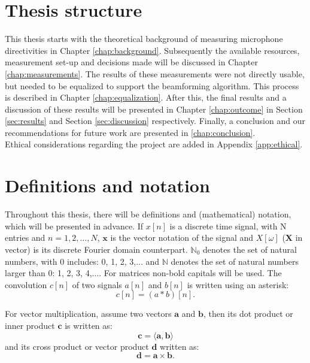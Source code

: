 \section{Thesis structure}
This thesis starts with the theoretical background of measuring microphone directivities in Chapter \ref{chap:background}.
Subsequently the available resources, measurement set-up and decisions made will be discussed in Chapter \ref{chap:measurements}.
The results of these measurements were not directly usable, but needed to be equalized to support the beamforming algorithm.
This process is described in Chapter \ref{chap:equalization}.
After this, the final results and a discussion of these results will be presented in Chapter \ref{chap:outcome} in Section \ref{sec:results} and Section \ref{sec:discussion} respectively.
Finally, a conclusion and our recommendations for future work are presented in \ref{chap:conclusion}. \\
Ethical considerations regarding the project are added in Appendix \ref{app:ethical}.

\section{Definitions and notation}
Throughout this thesis, there will be definitions and (mathematical) notation, which will be presented in advance.
If $x[n]$ is a discrete time signal, with N entries and $n=1,2,\ldots,N$, $\mathbf{x}$ is the vector notation of the signal and $X[\omega]$ ($\mathbf{X}$ in vector) is its discrete Fourier domain counterpart.
$\mathbb{N}_0$ denotes the set of natural numbers, with 0 includes: 0, 1, 2, 3,$\ldots$ and $\mathbb{N}$ denotes the set of natural numbers larger than 0: 1, 2, 3, 4,$\ldots$.
For matrices non-bold capitals will be used.
The convolution $c[n]$ of two signals $a[n]$ and $b[n]$ is written using an asterisk:
\begin{equation*}
c[n]=(a*b)[n].
\end{equation*}

For vector multiplication, assume two vectors $\mathbf{a}$ and $\mathbf{b}$, then its dot product or inner product $\mathbf{c}$ is written as:
\begin{equation*}
\mathbf{c}=\langle \mathbf{a},\mathbf{b}\rangle
\end{equation*}
and its cross product or vector product $\mathbf{d}$ written as:
\begin{equation*}
\mathbf{d}=\mathbf{a}\times\mathbf{b}.
\end{equation*}


